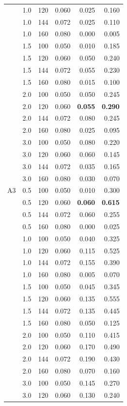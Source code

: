 \begin{table}[t]
\begin{tabular}{lrrrrr}
 & 1.0 & 120 & 0.060 & 0.025 & 0.160\\
 & 1.0 & 144 & 0.072 & 0.025 & 0.110\\
 & 1.0 & 160 & 0.080 & 0.000 & 0.005\\
 & 1.5 & 100 & 0.050 & 0.010 & 0.185\\
 & 1.5 & 120 & 0.060 & 0.050 & 0.240\\
 & 1.5 & 144 & 0.072 & 0.055 & 0.230\\
 & 1.5 & 160 & 0.080 & 0.015 & 0.100\\
 & 2.0 & 100 & 0.050 & 0.050 & 0.245\\
 & 2.0 & 120 & 0.060 & \textbf{0.055} & \textbf{0.290}\\
 & 2.0 & 144 & 0.072 & 0.080 & 0.245\\
 & 2.0 & 160 & 0.080 & 0.025 & 0.095\\
 & 3.0 & 100 & 0.050 & 0.080 & 0.220\\
 & 3.0 & 120 & 0.060 & 0.060 & 0.145\\
 & 3.0 & 144 & 0.072 & 0.035 & 0.165\\
 & 3.0 & 160 & 0.080 & 0.030 & 0.070\\
\addlinespace
A3 & 0.5 & 100 & 0.050 & 0.010 & 0.300\\
 & 0.5 & 120 & 0.060 & \textbf{0.060} & \textbf{0.615}\\
 & 0.5 & 144 & 0.072 & 0.060 & 0.255\\
 & 0.5 & 160 & 0.080 & 0.000 & 0.025\\
 & 1.0 & 100 & 0.050 & 0.040 & 0.325\\
 & 1.0 & 120 & 0.060 & 0.115 & 0.525\\
 & 1.0 & 144 & 0.072 & 0.155 & 0.390\\
 & 1.0 & 160 & 0.080 & 0.005 & 0.070\\
 & 1.5 & 100 & 0.050 & 0.045 & 0.345\\
 & 1.5 & 120 & 0.060 & 0.135 & 0.555\\
 & 1.5 & 144 & 0.072 & 0.135 & 0.445\\
 & 1.5 & 160 & 0.080 & 0.050 & 0.125\\
 & 2.0 & 100 & 0.050 & 0.110 & 0.415\\
 & 2.0 & 120 & 0.060 & 0.170 & 0.490\\
 & 2.0 & 144 & 0.072 & 0.190 & 0.430\\
 & 2.0 & 160 & 0.080 & 0.070 & 0.160\\
 & 3.0 & 100 & 0.050 & 0.145 & 0.270\\
 & 3.0 & 120 & 0.060 & 0.130 & 0.240\\

\end{tabular}
\end{table}
